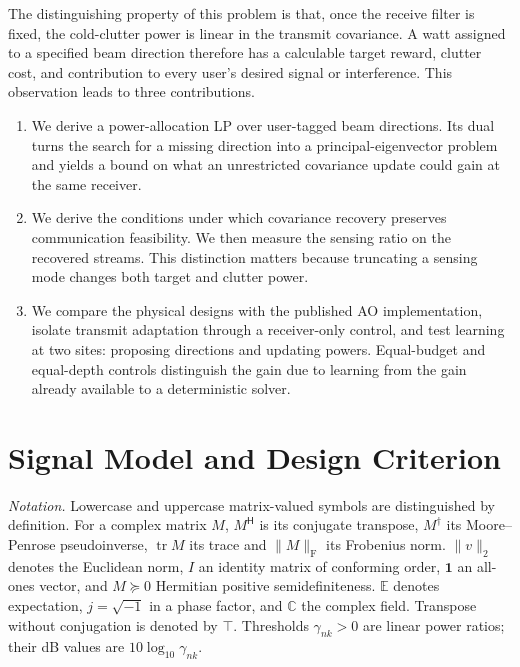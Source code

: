 \documentclass[journal]{IEEEtran}
\DeclareMathOperator{\tr}{tr}
\newcommand{\F}{_{\mathrm F}}
\newcommand{\norm}[1]{\lVert #1\rVert}
\begin{document}
The distinguishing property of this problem is that, once the receive filter is fixed, the cold-clutter power is linear in the transmit covariance. A watt assigned to a specified beam direction therefore has a calculable target reward, clutter cost, and contribution to every user's desired signal or interference. This observation leads to three contributions.
\begin{enumerate}
\item We derive a power-allocation LP over user-tagged beam directions. Its dual turns the search for a missing direction into a principal-eigenvector problem and yields a bound on what an unrestricted covariance update could gain at the same receiver.
\item We derive the conditions under which covariance recovery preserves communication feasibility. We then measure the sensing ratio on the recovered streams. This distinction matters because truncating a sensing mode changes both target and clutter power.
\item We compare the physical designs with the published AO implementation, isolate transmit adaptation through a receiver-only control, and test learning at two sites: proposing directions and updating powers. Equal-budget and equal-depth controls distinguish the gain due to learning from the gain already available to a deterministic solver.
\end{enumerate}
\section{Signal Model and Design Criterion}
\emph{Notation.} Lowercase and uppercase matrix-valued symbols are distinguished by definition. For a complex matrix $M$, $M^{\mathsf H}$ is its conjugate transpose, $M^\dagger$ its Moore--Penrose pseudoinverse, $\tr M$ its trace and $\norm M\F$ its Frobenius norm. $\norm v_2$ denotes the Euclidean norm, $I$ an identity matrix of conforming order, $\mathbf1$ an all-ones vector, and $M\succeq0$ Hermitian positive semidefiniteness. $\mathbb E$ denotes expectation, $j=\sqrt{-1}$ in a phase factor, and $\mathbb C$ the complex field. Transpose without conjugation is denoted by $\top$. Thresholds $\gamma_{nk}>0$ are linear power ratios; their dB values are $10\log_{10}\gamma_{nk}$.
\end{document}
